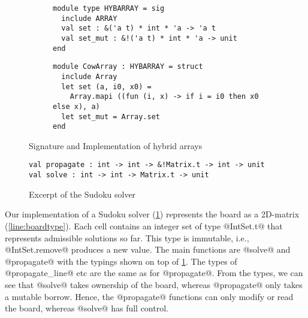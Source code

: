 \begin{figure}[tp]
  \centering
  \begin{subfigure}[t]{0.45\linewidth}
\begin{lstlisting}
module type HYBARRAY = sig
  include ARRAY
  val set : &('a t) * int * 'a -> 'a t
  val set_mut : &!('a t) * int * 'a -> unit
end
\end{lstlisting}
  \end{subfigure}\hfill
  \begin{subfigure}[t]{0.55\linewidth}
\begin{lstlisting}
module CowArray : HYBARRAY = struct
  include Array
  let set (a, i0, x0) =
    Array.mapi ((fun (i, x) -> if i = i0 then x0 else x), a)
  let set_mut = Array.set
end
\end{lstlisting}
  \end{subfigure}
  \vspace{-15pt}
  \caption{Signature and Implementation of hybrid arrays}
  \label{sig:hybarray}
  \label{ex:cow}

  \begin{subfigure}[t]{0.45\linewidth}
  
  \end{subfigure}\hfill
  \begin{subfigure}[t]{0.55\linewidth}
  
  \end{subfigure}
  \vspace{-10pt}
\begin{lstlisting}
val propagate : int -> int -> &!Matrix.t -> int -> unit
val solve : int -> int -> Matrix.t -> unit
\end{lstlisting}
  \vspace{-10pt}
  \caption{Excerpt of the Sudoku solver}
  \label{ex:sudoku}
\end{figure}


Our implementation of a Sudoku solver (\cref{ex:sudoku}) represents
the board as a 2D-matrix (\cref{line:boardtype}).
Each cell contains an integer set of type @IntSet.t@ that represents
admissible solutions so far. This type is immutable, i.e.,
@IntSet.remove@ produces a new value.
%
The main functions are @solve@ and @propagate@ with the typings shown
on top of \cref{ex:sudoku}. The types of @propagate_line@ etc are the
same as for @propagate@. From the types, we can see that @solve@ takes
ownership of the board, whereas @propagate@ only takes a mutable
borrow. Hence, the @propagate@ functions can only modify or read the board,
whereas @solve@ has full control. 

